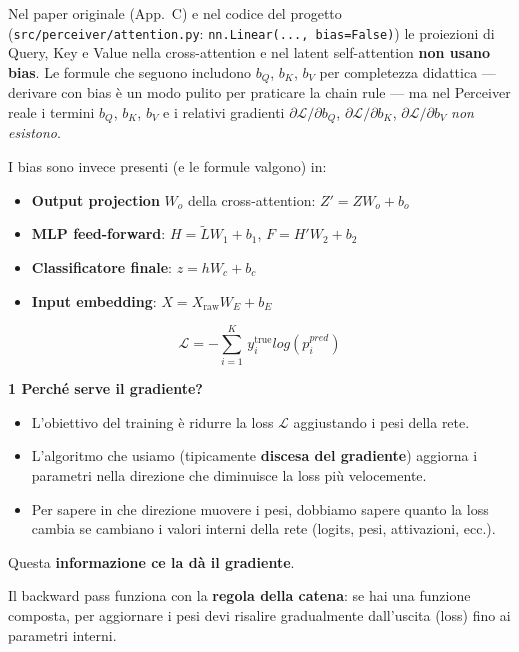 \documentclass[
  11pt,
]{article}
\begin{document}
\begin{notabox}[title={\textbf{Nota su $b_Q$, $b_K$, $b_V$: bias nelle proiezioni Q/K/V}}]
Nel paper originale (App.\ C) e nel codice del progetto (\texttt{src/perceiver/attention.py}: \texttt{nn.Linear(..., bias=False)}) le proiezioni di Query, Key e Value nella cross-attention e nel latent self-attention \textbf{non usano bias}. Le formule che seguono includono $b_Q$, $b_K$, $b_V$ per completezza didattica --- derivare con bias è un modo pulito per praticare la chain rule --- ma nel Perceiver reale i termini $b_Q$, $b_K$, $b_V$ e i relativi gradienti $\partial \mathcal{L}/\partial b_Q$, $\partial \mathcal{L}/\partial b_K$, $\partial \mathcal{L}/\partial b_V$ \emph{non esistono}.

\medskip
I bias sono invece presenti (e le formule valgono) in:
\begin{itemize}\setlength\itemsep{0.2em}
\item \textbf{Output projection} $W_o$ della cross-attention: $Z' = Z W_o + b_o$
\item \textbf{MLP feed-forward}: $H = \tilde L W_1 + b_1$, $F = H' W_2 + b_2$
\item \textbf{Classificatore finale}: $z = h W_c + b_c$
\item \textbf{Input embedding}: $X = X_{\text{raw}} W_E + b_E$
\end{itemize}
\end{notabox}

\[\mathcal{L} = - \sum_{i = 1}^{K}\, y_{i}^{\text{true}}log\left( p_{i}^{pred} \right)\]

\textbf{1 Perché serve il gradiente?}

\begin{itemize}
\item
  L'obiettivo del training è ridurre la loss
  \(\mathcal{L}\) aggiustando i pesi della rete.
\item
  L'algoritmo che usiamo (tipicamente \textbf{discesa
  del gradiente}) aggiorna i parametri nella direzione che diminuisce la
  loss più velocemente.
\item
  Per sapere in che direzione muovere i pesi, dobbiamo sapere quanto la
  loss cambia se cambiano i valori interni della rete (logits, pesi,
  attivazioni, ecc.).
\end{itemize}

Questa \textbf{informazione ce la dà il gradiente}.

Il backward pass funziona con la \textbf{regola della catena}: se hai
una funzione composta, per aggiornare i pesi devi risalire gradualmente
dall'uscita (loss) fino ai parametri interni.
\end{document}

